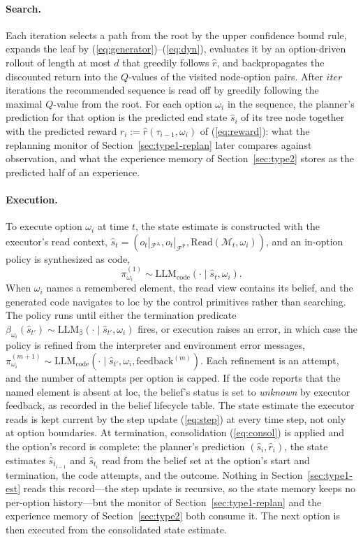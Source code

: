 \documentclass[11pt]{article}
\newcommand{\llm}[1]{\mathrm{LLM}_{\mathrm{#1}}}
\newcommand{\calF}{\mathcal{F}}
\newcommand{\calM}{\mathcal{M}}
\newcommand{\shat}{\hat{s}}
\newcommand{\FA}{\calF^{\mathrm{A}}}
\newcommand{\FP}{\calF^{\mathrm{P}}}
\newcommand{\Read}{\mathrm{Read}}
\newcommand{\loc}{\mathrm{loc}}
\begin{document}
\paragraph{Search.}
Each iteration selects a path from the root by the upper confidence bound rule, expands the leaf by (\ref{eq:generator})--(\ref{eq:dyn}), evaluates it by an option-driven rollout of length at most $d$ that greedily follows $\hat r$, and backpropagates the discounted return into the $Q$-values of the visited node-option pairs. After $\mathit{iter}$ iterations the recommended sequence is read off by greedily following the maximal $Q$-value from the root. For each option $\omega_i$ in the sequence, the planner's prediction for that option is the predicted end state $\shat_i$ of its tree node together with the predicted reward $\hat r_i:=\hat r(\tau_{i-1},\omega_i)$ of (\ref{eq:reward}): what the replanning monitor of Section~\ref{sec:type1-replan} later compares against observation, and what the experience memory of Section~\ref{sec:type2} stores as the predicted half of an experience.

\paragraph{Execution.}
To execute option $\omega_i$ at time $t$, the state estimate is constructed with the executor's read context, $\shat_t=(o_t|_{\FA},o_t|_{\FP},\Read(\calM_t,\omega_i))$, and an in-option policy is synthesized as code,
\begin{equation}
\pi^{(1)}_{\omega_i}\sim\llm{code}(\cdot\mid\shat_t,\omega_i).
\label{eq:code}
\end{equation}
When $\omega_i$ names a remembered element, the read view contains its belief, and the generated code navigates to $\loc$ by the control primitives rather than searching. The policy runs until either the termination predicate $\beta_{\omega_i}(\shat_{t'})\sim\llm{\beta}(\cdot\mid\shat_{t'},\omega_i)$ fires, or execution raises an error, in which case the policy is refined from the interpreter and environment error messages, $\pi^{(m+1)}_{\omega_i}\sim\llm{code}(\cdot\mid\shat_{t'},\omega_i,\mathrm{feedback}^{(m)})$. Each refinement is an attempt, and the number of attempts per option is capped. If the code reports that the named element is absent at $\loc$, the belief's status is set to \emph{unknown} by executor feedback, as recorded in the belief lifecycle table. The state estimate the executor reads is kept current by the step update (\ref{eq:step}) at every time step, not only at option boundaries. At termination, consolidation (\ref{eq:consol}) is applied and the option's record is complete: the planner's prediction $(\shat_i,\hat r_i)$, the state estimates $\shat_{t_{i-1}}$ and $\shat_{t_i}$ read from the belief set at the option's start and termination, the code attempts, and the outcome. Nothing in Section~\ref{sec:type1-est} reads this record---the step update is recursive, so the state memory keeps no per-option history---but the monitor of Section~\ref{sec:type1-replan} and the experience memory of Section~\ref{sec:type2} both consume it. The next option is then executed from the consolidated state estimate.
\end{document}
